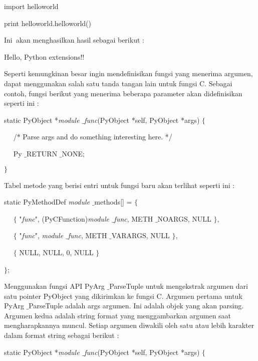 \noindent 
import helloworld \par
\vspace{12pt}
\noindent 
print helloworld.helloworld() \par
\vspace{14pt}
\noindent 
Ini~akan menghasilkan hasil sebagai berikut  : \par
\noindent 
Hello, Python extensions!! \par
\vspace{12pt}
Seperti kemungkinan besar ingin mendefinisikan fungsi yang menerima argumen, dapat menggunakan salah satu tanda tangan lain untuk fungsi C. Sebagai contoh, fungsi berikut yang menerima beberapa parameter akan didefinisikan seperti ini : \par
\noindent 
static PyObject *\textit{module $  \_  $func}(PyObject *self, PyObject *args)  $  \{  $ \par
\noindent 
~~ /* Parse args and do something interesting here. */ \par
\noindent 
~~ Py $  \_  $RETURN $  \_  $NONE; \par
\noindent 
 $  \}  $ \par
\vspace{12pt}
Tabel metode yang berisi entri untuk fungsi baru akan terlihat seperti ini : \par
\noindent 
static PyMethodDef \textit{module} $  \_  $methods[] =  $  \{  $ \par
\noindent 
~~  $  \{  $ "\textit{func}", (PyCFunction)\textit{module $  \_  $func}, METH $  \_  $NOARGS, NULL  $  \}  $, \par
\noindent 
~~  $  \{  $ "\textit{func}", \textit{module $  \_  $func}, METH $  \_  $VARARGS, NULL  $  \}  $, \par
\noindent 
~~  $  \{  $ NULL, NULL, 0, NULL  $  \}  $ \par
\noindent 
 $  \}  $; \par
\vspace{12pt}
Menggunakan fungsi API PyArg $  \_  $ParseTuple untuk mengekstrak argumen dari satu pointer PyObject yang dikirimkan ke fungsi C. Argumen pertama untuk PyArg $  \_  $ParseTuple adalah args argumen. Ini adalah objek yang akan parsing. Argumen kedua adalah string format yang menggambarkan argumen saat mengharapkannya muncul. Setiap argumen diwakili oleh satu atau lebih karakter dalam format string sebagai berikut : \par
\noindent 
static PyObject *\textit{module $  \_  $func}(PyObject *self, PyObject *args)  $  \{  $ \par
